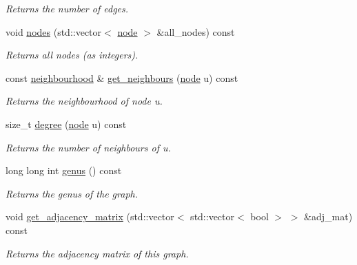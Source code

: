 \begin{DoxyCompactItemize}
\begin{DoxyCompactList}\small\item\em Returns the number of edges. \end{DoxyCompactList}\item 
\mbox{\label{classlgraph_1_1xxgraph_a9a24f0e1c0c40abc505e35d0dd9bf10a}} 
void \hyperlink{classlgraph_1_1xxgraph_a9a24f0e1c0c40abc505e35d0dd9bf10a}{nodes} (std\+::vector$<$ \hyperlink{namespacelgraph_a397169dd66adf725210a30fb7251773e}{node} $>$ \&all\+\_\+nodes) const
\begin{DoxyCompactList}\small\item\em Returns all nodes (as integers). \end{DoxyCompactList}\item 
const \hyperlink{namespacelgraph_a052e7766c13f3a43cec0aec8173fdede}{neighbourhood} \& \hyperlink{classlgraph_1_1xxgraph_a745a535506115c66ce0993ef7e7759ba}{get\+\_\+neighbours} (\hyperlink{namespacelgraph_a397169dd66adf725210a30fb7251773e}{node} u) const
\begin{DoxyCompactList}\small\item\em Returns the neighbourhood of node u. \end{DoxyCompactList}\item 
size\+\_\+t \hyperlink{classlgraph_1_1xxgraph_a20ebc2927ee8fb8bb0a2c3b448d9ed78}{degree} (\hyperlink{namespacelgraph_a397169dd66adf725210a30fb7251773e}{node} u) const
\begin{DoxyCompactList}\small\item\em Returns the number of neighbours of u. \end{DoxyCompactList}\item 
long long int \hyperlink{classlgraph_1_1xxgraph_a5f48a91046766e3e0b71a3326f2b9153}{genus} () const
\begin{DoxyCompactList}\small\item\em Returns the genus of the graph. \end{DoxyCompactList}\item 
\mbox{\label{classlgraph_1_1xxgraph_a8108bac3649acfae39a45e6de2b339b6}} 
void \hyperlink{classlgraph_1_1xxgraph_a8108bac3649acfae39a45e6de2b339b6}{get\+\_\+adjacency\+\_\+matrix} (std\+::vector$<$ std\+::vector$<$ bool $>$ $>$ \&adj\+\_\+mat) const
\begin{DoxyCompactList}\small\item\em Returns the adjacency matrix of this graph. \end{DoxyCompactList}\item 

\end{DoxyCompactItemize}
